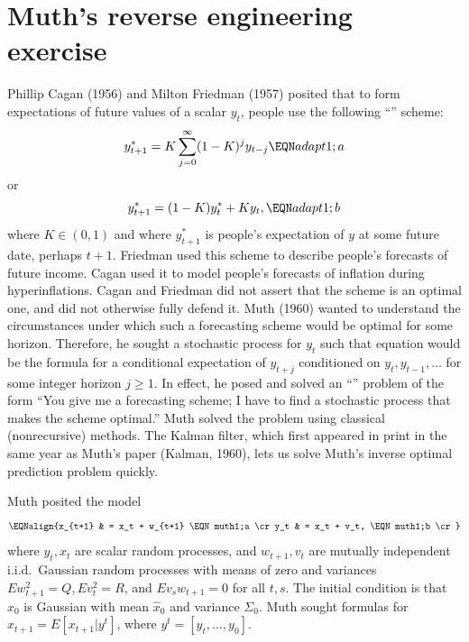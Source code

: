 \vfil\eject

\section{Muth's reverse engineering exercise}\label{sec:Muth_reverse}%
  Phillip Cagan  (1956) and Milton Friedman  (1957)
posited that to form
expectations of future values of a
scalar $y_t$, people use the following ``''
scheme:
$$ y_{t+1}^* = K \sum_{j=0}^\infty (1-K)^j y_{t-j} \EQN adapt1;a $$
or
$$ y_{t+1}^*  = (1-K) y_t^* + K y_t , \EQN adapt1;b$$
where $K \in (0,1)$ and where $y_{t+1}^*$ is people's expectation of $y$ at some future date, perhaps $t+1$.    Friedman
used this scheme to describe people's forecasts of future
income.  Cagan used it to model people's forecasts of inflation
during hyperinflations. Cagan and Friedman did not assert that
the scheme is an optimal one, and did not otherwise fully defend it.
Muth (1960) wanted to understand the circumstances under which
such a  forecasting  scheme  would be optimal for some horizon.  Therefore,
he sought a stochastic process for $y_t$ such that equation 
would be the formula for a conditional expectation of $y_{t+j}$ conditioned on $y_t, y_{t-1}, \ldots$
for some integer horizon $j \geq 1$.    In effect, he posed and solved an
``'' problem of the form  ``You give me
a forecasting scheme; I have to find a stochastic process
that makes the scheme optimal.''
Muth solved the problem using classical (nonrecursive) methods.
    The Kalman
filter, which  first appeared  in print in the same year as Muth's  paper (Kalman, 1960),  lets  us solve Muth's inverse optimal prediction
problem quickly.
%
%
%
%
%
%

Muth posited  the model
$$\EQNalign{x_{t+1} & = x_t + w_{t+1} \EQN muth1;a \cr
            y_t & = x_t + v_t, \EQN muth1;b \cr}$$
where  $y_t, x_t$ are scalar random processes,
and $w_{t+1}, v_t$ are mutually independent
i.i.d.~Gaussian random processes with means of zero and
variances $E w_{t+1}^2 = Q, E v_t^2 =R$, and  $Ev_s w_{t+1} = 0$
for all $t,s$.  The initial condition
is that $x_0$ is Gaussian with mean $\hat x_0$ and
variance $\Sigma_0$. Muth sought formulas for
$\hat x_{t+1} = E [x_{t+1} \vert y^t]$, where
$y^t = [y_t, \ldots, y_0]$.


